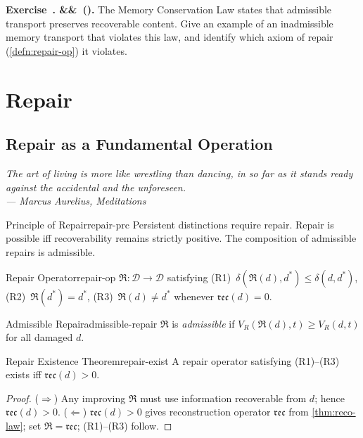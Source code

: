 \documentclass[12pt,twoside,openright]{book}
\newcommand{\repair}{\mathfrak{R}}
\newcommand{\reco}{\mathfrak{rec}}
\newenvironment{epigraph}[2]{%
  \vspace{1em}\begin{flushright}
  \begin{minipage}{0.72\textwidth}
  \itshape\small #1\\[0.4em]
  \upshape\footnotesize\sffamily\color{DistGray}--- #2
  \end{minipage}\end{flushright}\vspace{1.5em}}{}
\newcounter{exercise}[chapter]
\newenvironment{exercise}[1][]{%
  \refstepcounter{exercise}%
  \noindent\textbf{\sffamily\color{DistBlue}%
  Exercise~\thechapter.\theexercise%
  \ifx&#1&\else~(#1)\fi.}\enspace}{\par\medskip}
\begin{document}
\begin{exercise}
  The Memory Conservation Law states that admissible
  transport preserves recoverable content.
  Give an example of an inadmissible memory transport
  that violates this law, and identify which axiom of
  repair (\cref{defn:repair-op}) it violates.
\end{exercise}

\part{Repair}

\chapter{Repair as a Fundamental Operation}
\label{ch:repair}
\begin{epigraph}{The art of living is more like wrestling
  than dancing, in so far as it stands ready against the
  accidental and the unforeseen.}%
  {Marcus Aurelius, \textit{Meditations} \parencite{aurelius}}
\end{epigraph}

\begin{principle}{Principle of Repair}{repair-prc}
  Persistent distinctions require repair. Repair is
  possible iff recoverability remains strictly positive.
  The composition of admissible repairs is admissible.
\end{principle}

\begin{definition}{Repair Operator}{repair-op}
  $\repair:\mathcal{D}\to\mathcal{D}$ satisfying
  (R1)~$\delta(\repair(d),d^*)\le\delta(d,d^*)$,
  (R2)~$\repair(d^*)=d^*$,
  (R3)~$\repair(d)\ne d^*$ whenever $\reco(d)=0$.
\end{definition}

\begin{definition}{Admissible Repair}{admissible-repair}
  $\repair$ is \emph{admissible} if
  $V_R(\repair(d),t)\ge V_R(d,t)$ for all damaged $d$.
\end{definition}

\begin{theorem}{Repair Existence Theorem}{repair-exist}
  A repair operator satisfying (R1)--(R3) exists iff
  $\reco(d)>0$.
\end{theorem}
\begin{proof}
  ($\Rightarrow$) Any improving $\repair$ must use
  information recoverable from $d$; hence $\reco(d)>0$.
  ($\Leftarrow$) $\reco(d)>0$ gives reconstruction
  operator $\mathfrak{rec}$ from \cref{thm:reco-law};
  set $\repair=\mathfrak{rec}$; (R1)--(R3) follow.
\end{proof}
\end{document}
